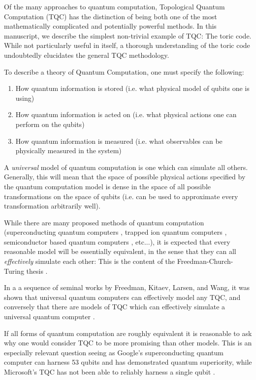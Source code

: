 \documentclass{article}
\theoremstyle{definition}
\numberwithin{figure}{section}
\begin{document}
Of the many approaches to quantum computation, Topological Quantum Computation (TQC) has the distinction of being both one of the most mathematically complicated and potentially powerful methods. In this manuscript, we describe the simplest non-trivial example of TQC: The toric code. While not particularly useful in itself, a thorough understanding of the toric code undoubtedly elucidates the general TQC methodology.

To describe a theory of Quantum Computation, one must specify the following:

\begin{enumerate}
\item How quantum information is stored (i.e. what physical model of qubits one is using)
\item How quantum information is acted on (i.e. what physical actions one can perform on the qubits)
\item How quantum information is measured (i.e. what observables can be physically measured in the system)
\end{enumerate}

A \textit{universal} model of quantum computation is one which can simulate all others. Generally, this will mean that the space of possible physical actions specified by the quantum computation model is dense in the space of all possible transformations on the space of qubits (i.e. can be used to approximate every transformation arbitrarily well).

While there are many proposed methods of quantum computation (superconducting quantum computers \cite{wendin2017quantum}, trapped ion quantum computers \cite{debnath2016demonstration}, semiconductor based quantum computers \cite{kane1998silicon}, etc...), it is expected that every reasonable model will be essentially equivalent, in the sense that they can all \textit{effectively} simulate each other: This is the content of the Freedman-Church-Turing thesis \cite{freedman2003topological}.

In a a sequence of seminal works by Freedman, Kitaev, Larsen, and Wang, it was shown that universal quantum computers can effectively model any TQC, and conversely that there are models of TQC which can effectively simulate a universal quantum computer \cite{freedman2002modular} \cite{freedman2002simulation}.

If all forms of quantum computation are roughly equivalent it is reasonable to ask why one would consider TQC to be more promising than other models. This is an especially relevant question seeing as Google's superconducting quantum computer can harness 53 qubits and has demonstrated quantum superiority, while Microsoft's TQC has not been able to reliably harness a single qubit \cite{arute2019quantum}.
\end{document}
